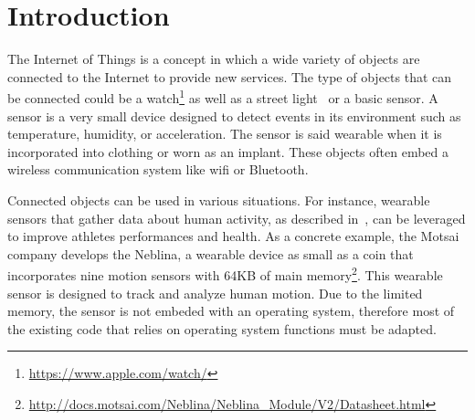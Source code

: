 \section{Introduction}
\label{sec:introduction}
The Internet of
Things is a concept in which a wide variety
of objects are connected to the Internet to
provide new services.  The
type of objects that can be connected could be a
watch\footnote{\url{https://www.apple.com/watch/}}
as well as a street light~\cite{smart-lamp-2011}
or a basic sensor. A sensor is a very small device
designed to detect events in its environment such
as temperature, humidity, or acceleration.  The
sensor is said wearable when it is incorporated
into clothing or worn as an implant. These objects often
embed a wireless communication system like wifi
or Bluetooth.  

Connected objects can be used in various
situations.  For instance, wearable sensors that
gather data about human activity, as described
in~\cite{recofit}, can be leveraged to improve
athletes performances and health.  As a concrete
example, the Motsai company develops the Neblina,
a wearable device as small as a coin that
incorporates nine motion sensors with 64KB of main
memory\footnote{\url{http://docs.motsai.com/Neblina/Neblina_Module/V2/Datasheet.html}}.
This wearable sensor is designed to track and
analyze human motion. Due to the limited memory,
the sensor is not embeded with an operating system,
therefore most of the existing code that relies on
operating system functions must be adapted.

